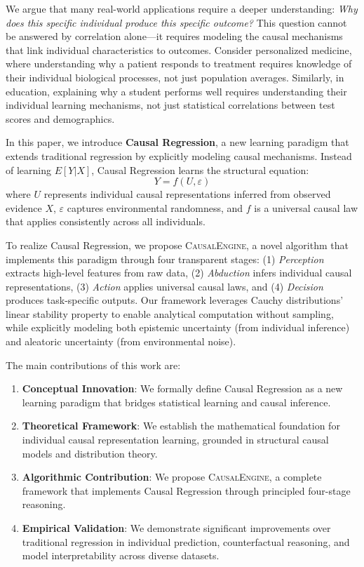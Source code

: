 \documentclass[conference]{IEEEtran}
\newcommand{\causalengine}{\textsc{CausalEngine}}
\begin{document}
We argue that many real-world applications require a deeper understanding: \textit{Why does this specific individual produce this specific outcome?} This question cannot be answered by correlation alone—it requires modeling the causal mechanisms that link individual characteristics to outcomes. Consider personalized medicine, where understanding why a patient responds to treatment requires knowledge of their individual biological processes, not just population averages. Similarly, in education, explaining why a student performs well requires understanding their individual learning mechanisms, not just statistical correlations between test scores and demographics.

In this paper, we introduce \textbf{Causal Regression}, a new learning paradigm that extends traditional regression by explicitly modeling causal mechanisms. Instead of learning $E[Y|X]$, Causal Regression learns the structural equation:
\begin{equation}
Y = f(U, \varepsilon)
\end{equation}
where $U$ represents individual causal representations inferred from observed evidence $X$, $\varepsilon$ captures environmental randomness, and $f$ is a universal causal law that applies consistently across all individuals.

To realize Causal Regression, we propose \causalengine{}, a novel algorithm that implements this paradigm through four transparent stages: (1) \textit{Perception} extracts high-level features from raw data, (2) \textit{Abduction} infers individual causal representations, (3) \textit{Action} applies universal causal laws, and (4) \textit{Decision} produces task-specific outputs. Our framework leverages Cauchy distributions' linear stability property to enable analytical computation without sampling, while explicitly modeling both epistemic uncertainty (from individual inference) and aleatoric uncertainty (from environmental noise).

The main contributions of this work are:

\begin{enumerate}
\item \textbf{Conceptual Innovation}: We formally define Causal Regression as a new learning paradigm that bridges statistical learning and causal inference.

\item \textbf{Theoretical Framework}: We establish the mathematical foundation for individual causal representation learning, grounded in structural causal models and distribution theory.

\item \textbf{Algorithmic Contribution}: We propose \causalengine{}, a complete framework that implements Causal Regression through principled four-stage reasoning.

\item \textbf{Empirical Validation}: We demonstrate significant improvements over traditional regression in individual prediction, counterfactual reasoning, and model interpretability across diverse datasets.
\end{enumerate}
\end{document}
